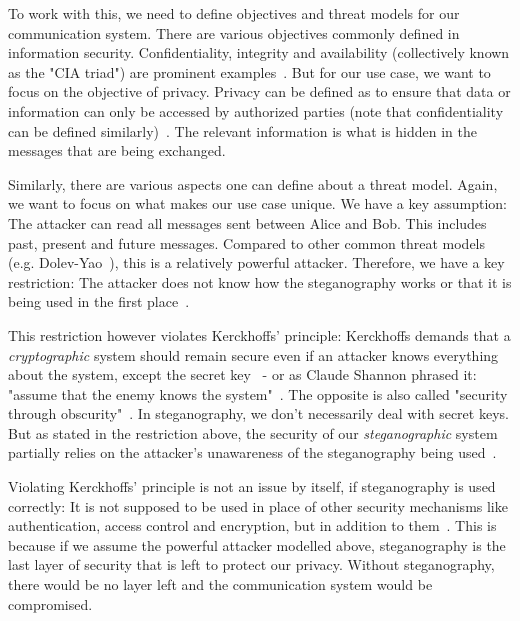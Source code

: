 To work with this, we need to define objectives and threat models for our communication system. There are various objectives commonly defined in information security. Confidentiality, integrity and availability (collectively known as the "CIA triad") are prominent examples~\cite{aliIoTSecurityReview2019,qadirReviewPaperCryptography2019,chowdhuryChatGPTThreatCIA2023}. But for our use case, we want to focus on the objective of privacy. Privacy can be defined as to ensure that data or information can only be accessed by authorized parties (note that confidentiality can be defined similarly)~\cite{chowdhuryChatGPTThreatCIA2023}. The relevant information is what is hidden in the messages that are being exchanged.

Similarly, there are various aspects one can define about a threat model. Again, we want to focus on what makes our use case unique. We have a key assumption: The attacker can read all messages sent between Alice and Bob. This includes past, present and future messages. Compared to other common threat models (e.g. Dolev-Yao~\cite{dolevSecurityPublicKey1983}), this is a relatively powerful attacker. Therefore, we have a key restriction: The attacker does not know how the steganography works or that it is being used in the first place~\cite{al-aniOverviewMainFundamentals2010}.

This restriction however violates Kerckhoffs' principle: Kerckhoffs demands that a \textit{cryptographic} system should remain secure even if an attacker knows everything about the system, except the secret key~\cite{andersonLimitsSteganography1998,smithEffectiveSecurityObscurity2022} - or as Claude Shannon phrased it: "assume that the enemy knows the system"~\cite{shannonCommunicationTheorySecrecy1949}. The opposite is also called "security through obscurity"~\cite{smithEffectiveSecurityObscurity2022}. In steganography, we don't necessarily deal with secret keys. But as stated in the restriction above, the security of our \textit{steganographic} system partially relies on the attacker's unawareness of the steganography being used~\cite{al-aniOverviewMainFundamentals2010}.

Violating Kerckhoffs' principle is not an issue by itself, if steganography is used correctly: It is not supposed to be used in place of other security mechanisms like authentication, access control and encryption, but in addition to them~\cite{al-aniOverviewMainFundamentals2010}. This is because if we assume the powerful attacker modelled above, steganography is the last layer of security that is left to protect our privacy. Without steganography, there would be no layer left and the communication system would be compromised.

